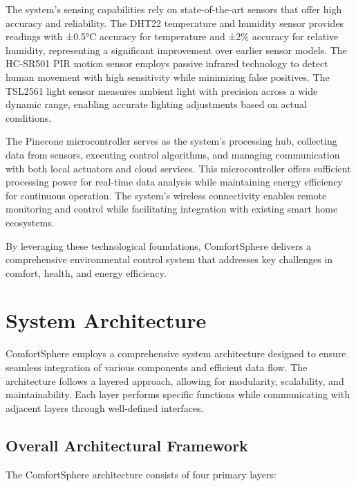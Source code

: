 \documentclass[a4paper]{scrartcl}
\begin{document}
    The system's sensing capabilities rely on state-of-the-art sensors that offer high accuracy and reliability. The DHT22 temperature and humidity sensor provides readings with ±0.5°C accuracy for temperature and ±2\% accuracy for relative humidity, representing a significant improvement over earlier sensor models. The HC-SR501 PIR motion sensor employs passive infrared technology to detect human movement with high sensitivity while minimizing false positives. The TSL2561 light sensor measures ambient light with precision across a wide dynamic range, enabling accurate lighting adjustments based on actual conditions.
    
    The Pinecone microcontroller serves as the system's processing hub, collecting data from sensors, executing control algorithms, and managing communication with both local actuators and cloud services. This microcontroller offers sufficient processing power for real-time data analysis while maintaining energy efficiency for continuous operation. The system's wireless connectivity enables remote monitoring and control while facilitating integration with existing smart home ecosystems.
    
    By leveraging these technological foundations, ComfortSphere delivers a comprehensive environmental control system that addresses key challenges in comfort, health, and energy efficiency.

	\section{System Architecture}
	\label{sec:system architecture}
	ComfortSphere employs a comprehensive system architecture designed to ensure seamless integration of various components and efficient data flow. The architecture follows a layered approach, allowing for modularity, scalability, and maintainability. Each layer performs specific functions while communicating with adjacent layers through well-defined interfaces.
	
	\subsection{Overall Architectural Framework}
	The ComfortSphere architecture consists of four primary layers:
	
\end{document}
